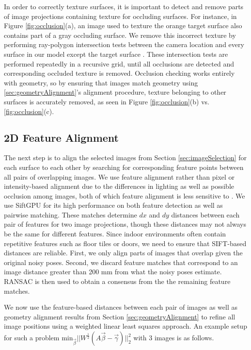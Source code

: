 \documentclass[]{spie}  %
\begin{document}
In order to correctly texture surfaces, it is important to detect and
remove parts of image projections containing texture for occluding
surfaces. For instance, in Figure \ref{fig:occlusion}(a), an image
used to texture the orange target surface also contains part of a gray
occluding surface. We remove this incorrect texture by performing
ray-polygon intersection tests between the camera location and every
surface in our model except the target surface
\cite{rayintersection}. These intersection tests are performed repeatedly in a
recursive grid, until all occlusions are detected and corresponding
occluded texture is removed. Occlusion checking works entirely with
geometry, so by ensuring that images match geometry using
\ref{sec:geometryAlignment}'s alignment procedure, texture belonging
to other surfaces is accurately removed, as seen in Figure
\ref{fig:occlusion}(b) vs. \ref{fig:occlusion}(c).

\subsection{2D Feature Alignment}
\label{sec:robustSIFTFeatureMatching}
The next step is to align the selected images from Section
\ref{sec:imageSelection} for each surface to each other by searching
for corresponding feature points between all pairs of overlapping
images. We use feature alignment rather than pixel or intensity-based
alignment due to the differences in lighting as well as possible
occlusion among images, both of which feature alignment is less
sensitive to \cite{lowe1999object, mikolajczyk2005performance,
  szeliski2006image}. We use SiftGPU \cite{siftgpu} for its high
performance on both feature detection as well as pairwise
matching. These matches determine $dx$ and $dy$ distances between each
pair of features for two image projections, though these distances may
not always be the same for different features. Since indoor
environments often contain repetitive features such as floor tiles or
doors, we need to ensure that SIFT-based distances are
reliable. First, we only align parts of images that overlap given the
original noisy poses. Second, we discard feature matches that
correspond to an image distance greater than 200 mm from what the
noisy poses estimate. RANSAC \cite{fischler1981random} is then used to
obtain a consensus from the the remaining feature matches.

We now use the feature-based distances between each pair of images as
well as geometry alignment results from Section
\ref{sec:geometryAlignment} to refine all image positions using a
weighted linear least squares approach. An example setup for such a problem $\textrm{min}_{\vec{\beta}}
||W^\frac{1}{2}(A \vec{\beta} - \vec{\gamma})||_2^2 $ with 3 images is
as follows.
\end{document}
